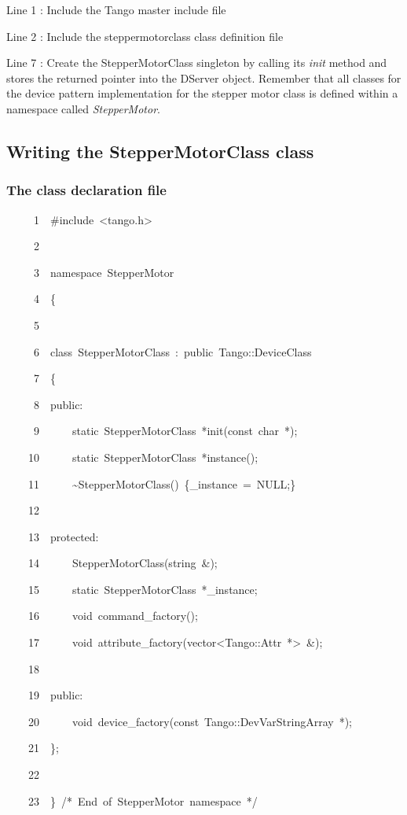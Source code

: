 Line 1 : Include the Tango master include file

Line 2 : Include the steppermotorclass class definition file

Line 7 : Create the StepperMotorClass singleton by calling its \emph{init}
method and stores the returned pointer into the DServer object. Remember
that all classes for the device pattern implementation for the stepper
motor class is defined within a namespace called
\emph{StepperMotor}.

\subsection{Writing the StepperMotorClass class\label{Command fact}}

\subsubsection{The class declaration file}


\begin{lyxcode}
~~~~~1~~\#include~<tango.h>

~~~~~2~~

~~~~~3~~namespace~StepperMotor

~~~~~4~~\{

~~~~~5~~

~~~~~6~~class~StepperMotorClass~:~public~Tango::DeviceClass

~~~~~7~~\{

~~~~~8~~public:

~~~~~9~~~~~~static~StepperMotorClass~{*}init(const~char~{*});

~~~~10~~~~~~static~StepperMotorClass~{*}instance();

~~~~11~~~~~~\textasciitilde{}StepperMotorClass()~\{\_instance~=~NULL;\}

~~~~12~~~~~~~~~~

~~~~13~~protected:

~~~~14~~~~~~StepperMotorClass(string~\&);

~~~~15~~~~~~static~StepperMotorClass~{*}\_instance;

~~~~16~~~~~~void~command\_factory();

~~~~17~~~~~~void~attribute\_factory(vector<Tango::Attr~{*}>~\&);

~~~~18~~~~~~~~~~

~~~~19~~public:

~~~~20~~~~~~void~device\_factory(const~Tango::DevVarStringArray~{*});

~~~~21~~\};

~~~~22~~

~~~~23~~\}~/{*}~End~of~StepperMotor~namespace~{*}/
\end{lyxcode}


